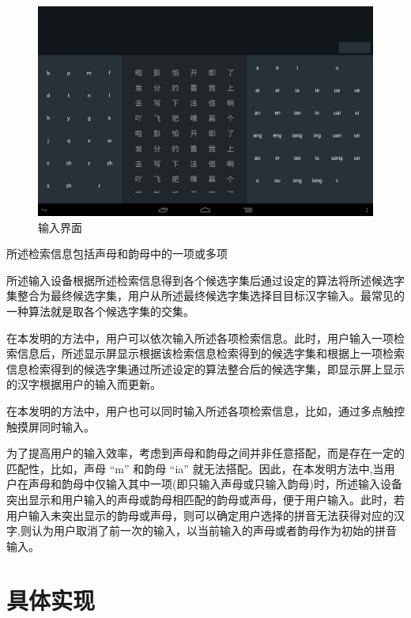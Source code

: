 	\begin{figure}[h]
	\noindent\includegraphics[width=150mm]{img/layout1_background}
	\caption{输入界面}
	\label{fig:layout1_background}
	\end{figure}

	所述检索信息包括声母和韵母中的一项或多项

	所述输⼊设备根据所述检索信息得到各个候选字集后通过设定的算法将所述候选字集整合为最终候选字集，⽤户从所述最终候选字集选择⽬目标汉字输入。最常见的一种算法就是取各个候选字集的交集。

	在本发明的方法中，⽤户可以依次输⼊所述各项检索信息。此时，用户输入一项检索信息后，所述显⽰屏显示根据该检索信息检索得到的候选字集和根据上一项检索信息检索得到的候选字集通过所述设定的算法整合后的候选字集，即显⽰屏上显示的汉字根据用户的输入而更新。

	在本发明的方法中，用户也可以同时输入所述各项检索信息，⽐如，通过多点触控触摸屏同时输入。

	为了提高⽤户的输入效率，考虑到声母和韵母之间并⾮任意搭配，⽽是存在一定的 匹配性，比如，声母 “m” 和韵母 “ia” 就⽆法搭配。因此，在本发明方法中,当用户在声母和韵母中仅输入其中⼀项(即只输⼊声母或只输入韵母)时，所述输⼊设备突出显⽰和⽤户输⼊的声母或韵母相匹配的韵母或声母，便于⽤户输入。此时，若⽤户输⼊未突出显示的韵母或声母，则可以确定⽤户选择的拼音⽆法获得对应的汉字,则认为用户取消了前一次的输⼊，以当前输⼊的声母或者韵母作为初始的拼⾳输入。

	\section{具体实现}

